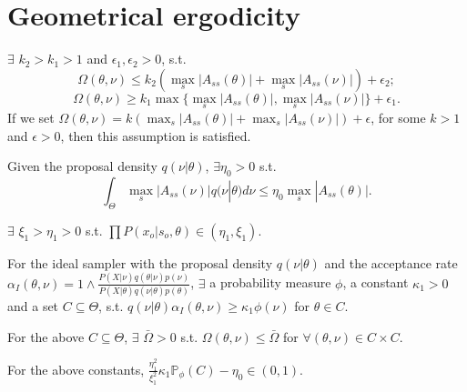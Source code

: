 \section{Geometrical ergodicity}
\begin{assumption}
$\exists$ $k_2 > k_1 > 1$ and $\epsilon_1, \epsilon_2 > 0$, s.t. 
$$\Omega(\theta, \nu) \leq k_2 (  \max_s|A_{ss}(\theta)| +  \max_s|A_{ss}(\nu)| ) + \epsilon_2 ;$$
$$\Omega(\theta, \nu) \geq k_1 \max \{ \max_s|A_{ss}(\theta)|, \max_s|A_{ss}(\nu)| \} + \epsilon_1.$$ 
If we set $\Omega(\theta, \nu) = k (  \max_s|A_{ss}(\theta)| +  \max_s|A_{ss}(\nu)| ) + \epsilon$, for some $k > 1$ and $\epsilon > 0$, then this assumption is satisfied.
\end{assumption}

\begin{assumption}
Given the proposal density $q(\nu | \theta)$, $\exists \eta_0 > 0$ s.t. $$ \int_\Theta \max_s|A_{ss}(\nu)| q(\nu | \theta)d\nu \leq \eta_0 \max_s|A_{ss}(\theta)|.$$
\end{assumption}

\begin{assumption}
$\exists$ $ \xi_1 > \eta_1 > 0$ s.t. $\prod P(x_o | s_o, \theta) \in (\eta_1, \xi_1)$.
\end{assumption}

\begin{assumption}
For the ideal sampler with the proposal density $q(\nu| \theta)$ and the acceptance rate $\alpha_I(\theta, \nu) = 1 \wedge \frac{P(X | \nu)q(\theta| \nu)p(\nu)}{P(X | \theta)q(\nu| \theta)p(\theta)}$, $\exists$ a probability measure $\phi$, a constant $\kappa_1 > 0$ and a set $C \subseteq \Theta$, s.t. $q(\nu | \theta) \alpha_I(\theta, \nu) \geq \kappa_1 \phi(\nu)$ for $\theta \in C$. 
\end{assumption}

\begin{assumption}
For the above $C \subseteq \Theta$, $\exists$ $\bar{\Omega} > 0$ s.t. $\Omega(\theta, \nu)  \leq \bar{\Omega}$ for $\forall (\theta, \nu) \in C \times C$.
\end{assumption}

\begin{assumption}
For the above constants, $\frac{\eta_1^2}{\xi_1^2} \kappa_1 \mathbb{P}_\phi(C)  - \eta_0 \in (0, 1).$
\end{assumption}

